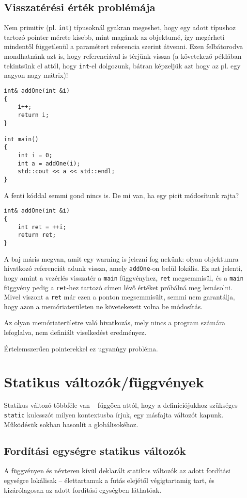 \documentclass[a4paper,11.5pt]{article}
\begin{document}
	\subsection{Visszatérési érték problémája}
	Nem primitív (pl. \texttt{int}) típusoknál gyakran megeshet, hogy egy adott típushoz tartozó pointer mérete kisebb, mint magának az objektumé, így megérheti mindentől függetlenül a paramétert referencia szerint átvenni. Ezen felbátorodva mondhatnánk azt is, hogy referenciával is térjünk vissza (a követekező példában tekintsünk el attól, hogy \texttt{int}-el dolgozunk, bátran képzeljük azt hogy az pl. egy nagyon nagy mátrix)!
	\begin{lstlisting}
int& addOne(int &i)
{
	i++;
	return i;
}

int main()
{
	int i = 0;
	int a = addOne(i);
	std::cout << a << std::endl;
}
	\end{lstlisting}
	A fenti kóddal semmi gond nincs is. De mi van, ha egy picit módosítunk rajta?
	\begin{lstlisting}
int& addOne(int &i)
{
	int ret = ++i;
	return ret;
}
	\end{lstlisting}
	A baj máris megvan, amit egy warning is jelezni fog nekünk: olyan objektumra hivatkozó referenciát adunk vissza, amely \texttt{addOne}-on belül lokális. Ez azt jelenti, hogy amint a vezérlés visszatér a \texttt{main} függvényhez, \texttt{ret} megsemmisül, és a \texttt{main} függvény pedig a \texttt{ret}-hez tartozó címen lévő értéket próbálná meg lemásolni. Mivel viszont a \texttt{ret} már ezen a ponton megsemmisült, semmi nem garantálja, hogy azon a memóriaterületen ne követekezett volna be módosítás.
	
	\medskip
	Az olyan memóriaterületre való hivatkozás, mely nincs a program számára lefoglalva, nem definiált viselkedést eredményez.
	\begin{note}
		Értelemszerűen pointerekkel ez ugyanúgy probléma.
	\end{note}
	\section{Statikus változók/függvények}
	Statikus változó többféle van -- függően attól, hogy a definíciójukhoz szükséges \texttt{static} kulcsszót milyen kontextusba írjuk, egy másfajta változót kapunk. Működésük sokban hasonlít a globálisokéhoz.
	\subsection{Fordítási egységre statikus változók}
	A függvényen és névteren kívül deklarált statikus változók az adott fordítási egységre lokálisak -- élettartamuk a futás elejétől végigtartamig tart, és kizárólagosan az adott fordítási egységben láthatóak.
	\medskip
	
\end{document}
